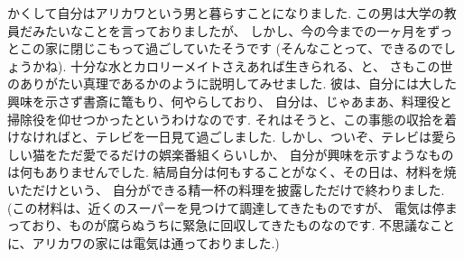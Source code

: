 かくして自分はアリカワという男と暮らすことになりました.
この男は大学の教員だみたいなことを言っておりましたが、
しかし、今の今までの一ヶ月をずっとこの家に閉じこもって過ごしていたそうです
(そんなことって、できるのでしょうかね).
十分な水とカロリーメイトさえあれば生きられる、と、
さもこの世のありがたい真理であるかのように説明してみせました.
彼は、自分には大した興味を示さず書斎に篭もり、何やらしており、
自分は、じゃあまあ、料理役と掃除役を仰せつかったというわけなのです.
それはそうと、この事態の収拾を着けなければと、テレビを一日見て過ごしました.
しかし、ついぞ、テレビは愛らしい猫をただ愛でるだけの娯楽番組くらいしか、
自分が興味を示すようなものは何もありませんでした.
結局自分は何もすることがなく、その日は、材料を焼いただけという、
自分ができる精一杯の料理を披露しただけで終わりました.
(この材料は、近くのスーパーを見つけて調達してきたものですが、
電気は停まっており、ものが腐らぬうちに緊急に回収してきたものなのです.
不思議なことに、アリカワの家には電気は通っておりました.)

